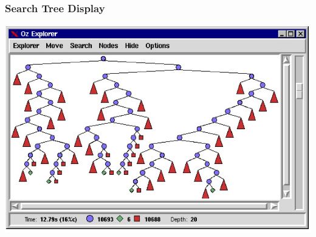 \documentclass[dvipsnames,aspectratio=169]{beamer}
\begin{document}
\begin{frame}
  \frametitle{Search Tree Display \cite{DBLP:conf/iclp/Schulte97}}
  
  \includegraphics[width=.6\textwidth]{images/oz_explorer_1.jpg}
  
\end{frame}
\end{document}
